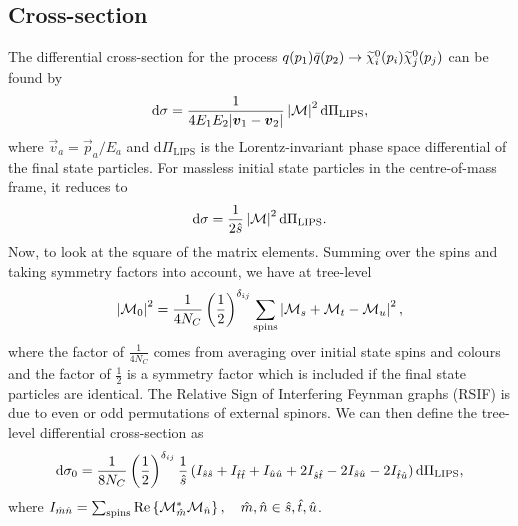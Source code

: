 \documentclass[english,notitlepage]{article}
\begin{document}
\subsection{Cross-section}
    The differential cross-section for the process \(q(p_1)\bar{q}(p_2) \to \nino[i](p_i) \nino[j](p_j)\) can be found by
    \begin{equation}
        \mathrm{d}\sigma = \frac{1}{4E_1E_2|\vec{v}_1 - \vec{v}_2|} \abs{\M}^2 \mathrm{d}\Pi_\text{LIPS},
    \end{equation}
    where \(\vec{v}_a = \vec{p}_a / E_a\) and \(\mathrm{d}\Pi_\text{LIPS}\) is the Lorentz-invariant phase space differential of the final state particles.
    For massless initial state particles in the centre-of-mass frame, it
    reduces to
    \begin{equation}
        \mathrm{d}\sigma = \frac{1}{2\hat{s}} \abs{\M}^2 \mathrm{d}\Pi_\text{LIPS}.
    \end{equation}
    Now, to look at the square of the matrix elements.
    Summing over the spins and taking symmetry factors into account, we have at tree-level
    \begin{align}
        \abs{\M_0}^2 = \frac{1}{4 N_C} \pclosed{\frac{1}{2}}^{\delta_{ij}} \sum_\text{spins} \abs{\M_s + \M_t - \M_u}^2,
    \end{align}
    where the factor of \(\frac{1}{4N_C}\) comes from averaging over initial state spins and colours and the factor of \(\frac{1}{2}\) is a symmetry factor which is included if the final state particles are identical.
    The Relative Sign of Interfering Feynman graphs (RSIF) is due to even or odd permutations of external spinors.
    We can then define the tree-level differential cross-section as
    \begin{equation}
        \label{eq:dsigma}
        \mathrm{d}\sigma_0 = \frac{1}{8N_C} \pclosed{\frac{1}{2}}^{\delta_{ij}} \frac{1}{\hat{s}} \pclosed{I_{\hat{s}\hat{s}} + I_{\hat{t}\hat{t}} + I_{\hat{u}\hat{u}} + 2I_{\hat{s}\hat{t}} - 2I_{\hat{s}\hat{u}} - 2I_{\hat{t}\hat{u}}} \mathrm{d}\Pi_\text{LIPS},
    \end{equation}
    where \(I_{\hat{m}\hat{n}} = \sum_{\text{spins}} \Re{\M_{\hat{m}}^\ast \M_{\hat{n}}}, \quad \hat{m}, \hat{n} \in \hat{s}, \hat{t}, \hat{u}\).
\end{document}
